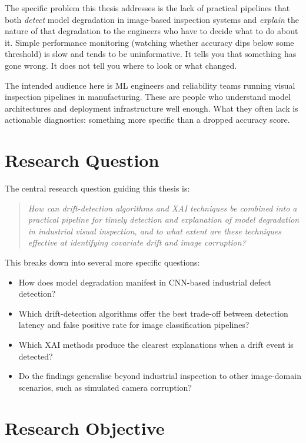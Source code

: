The specific problem this thesis addresses is the lack of practical pipelines that both \textit{detect} model degradation in image-based inspection systems and \textit{explain} the nature of that degradation to the engineers who have to decide what to do about it. Simple performance monitoring (watching whether accuracy dips below some threshold) is slow and tends to be uninformative. It tells you that something has gone wrong. It does not tell you where to look or what changed.

The intended audience here is ML engineers and reliability teams running visual inspection pipelines in manufacturing. These are people who understand model architectures and deployment infrastructure well enough. What they often lack is actionable diagnostics: something more specific than a dropped accuracy score.

\section{Research Question}%
\label{sec:onderzoeksvraag}

The central research question guiding this thesis is:

\begin{quote}
\textit{How can drift-detection algorithms and XAI techniques be combined into a practical pipeline for timely detection and explanation of model degradation in industrial visual inspection, and to what extent are these techniques effective at identifying covariate drift and image corruption?}
\end{quote}

This breaks down into several more specific questions:

\begin{itemize}
  \item How does model degradation manifest in CNN-based industrial defect detection?
  \item Which drift-detection algorithms offer the best trade-off between detection latency and false positive rate for image classification pipelines?
  \item Which XAI methods produce the clearest explanations when a drift event is detected?
  \item Do the findings generalise beyond industrial inspection to other image-domain scenarios, such as simulated camera corruption?
\end{itemize}

\section{Research Objective}%
\label{sec:onderzoeksdoelstelling}

